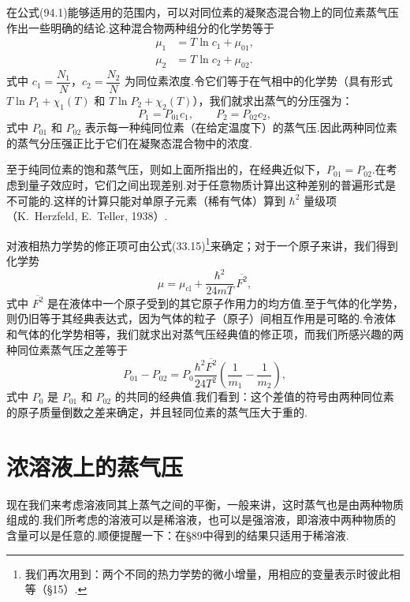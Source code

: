 在公式(94.1)能够适用的范围内，可以对同位素的凝聚态混合物上的同位素蒸气压作出一些明确的结论.这种混合物两种组分的化学势等于
\begin{equation*}
\begin{aligned}
  \mu_1&=T\ln c_1+\mu_{01},\\
  \mu_2&=T\ln c_2+\mu_{02}.
\end{aligned}
\end{equation*}
式中 $c_1=\dfrac{N_1}{N}$，$c_2=\dfrac{N_2}{N}$ 为同位素浓度.令它们等于在气相中的化学势（具有形式 $T\ln P_1+\chi_1(T)$ 和 $T\ln P_2+\chi_2(T)$），我们就求出蒸气的分压强为：
\begin{equation}
  P_1=P_{01}c_1,\qquad P_2=P_{02}c_2,
\end{equation}
式中 $P_{01}$ 和 $P_{02}$ 表示每一种纯同位素（在给定温度下）的蒸气压.因此两种同位素的蒸气分压强正比于它们在凝聚态混合物中的浓度.

至于纯同位素的饱和蒸气压，则如上面所指出的，在经典近似下，$P_{01}=P_{02}$.在考虑到量子效应时，它们之间出现差别.对于任意物质计算出这种差别的普遍形式是不可能的.这样的计算只能对单原子元素（稀有气体）算到 $\hbar^2$ 量级项（K.~Herzfeld, E.~Teller, 1938）.

对液相热力学势的修正项可由公式(33.15)\footnote{我们再次用到：两个不同的热力学势的微小增量，用相应的变量表示时彼此相等（§15）.}来确定；对于一个原子来讲，我们得到化学势
\begin{equation*}
  \mu=\mu_{\mathrm{cl}}+\frac{\hbar^2}{24mT}\,\overline{F^2},
\end{equation*}
式中 $\overline{F^2}$ 是在液体中一个原子受到的其它原子作用力的均方值.至于气体的化学势，则仍旧等于其经典表达式，因为气体的粒子（原子）间相互作用是可略的.令液体和气体的化学势相等，我们就求出对蒸气压经典值的修正项，而我们所感兴趣的两种同位素蒸气压之差等于
\begin{equation}
  P_{01}-P_{02}
  =P_0\frac{\hbar^2\overline{F^2}}{24T^2}
  \left(\frac{1}{m_1}-\frac{1}{m_2}\right),
\end{equation}
式中 $P_0$ 是 $P_{01}$ 和 $P_{02}$ 的共同的经典值.我们看到：这个差值的符号由两种同位素的原子质量倒数之差来确定，并且轻同位素的蒸气压大于重的.

\section{浓溶液上的蒸气压}

现在我们来考虑溶液同其上蒸气之间的平衡，一般来讲，这时蒸气也是由两种物质组成的.我们所考虑的溶液可以是稀溶液，也可以是强溶液，即溶液中两种物质的含量可以是任意的.顺便提醒一下：在§89中得到的结果只适用于稀溶液.

